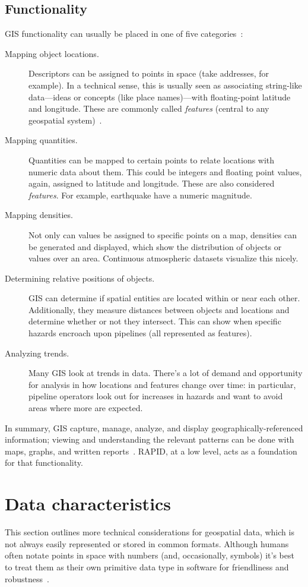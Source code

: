 \subsection{Functionality}
GIS functionality can usually be placed in one of five categories~\cite{Esriintro}:

\begin{description}
  \item[Mapping object locations.] Descriptors can be assigned to points in space (take addresses, for example). In a technical sense, this is usually seen as associating string-like data---ideas or concepts (like place names)---with floating-point latitude and longitude. These are commonly called \textit{features} (central to any geospatial system)~\cite{Kottman2009}.
  \item[Mapping quantities.] Quantities can be mapped to certain points to relate locations with numeric data about them. This could be integers and floating point values, again, assigned to latitude and longitude. These are also considered \textit{features}. For example, earthquake have a numeric magnitude.
  \item[Mapping densities.] Not only can values be assigned to specific points on a map, densities can be generated and displayed, which show the distribution of objects or values over an area. Continuous atmospheric datasets visualize this nicely.
  \item[Determining relative positions of objects.] GIS can determine if spatial entities are located within or near each other. Additionally, they measure distances between objects and locations and determine whether or not they intersect. This can show when specific hazards encroach upon pipelines (all represented as features).
  \item[Analyzing trends.] Many GIS look at trends in data. There's a lot of demand and opportunity for analysis in how locations and features change over time: in particular, pipeline operators look out for increases in hazards and want to avoid areas where more are expected.
\end{description}

In summary, GIS capture, manage, analyze, and display geographically-referenced information; viewing and understanding the relevant patterns can be done with maps, graphs, and written reports~\cite{Esriintro}. RAPID, at a low level, acts as a foundation for that functionality.

\section{Data characteristics}
This section outlines more technical considerations for geospatial data, which is not always easily represented or stored in common formats. Although humans often notate points in space with numbers (and, occasionally, symbols) it's best to treat them as their own primitive data type in software for friendliness and robustness~\cite{gentle_intro}.

